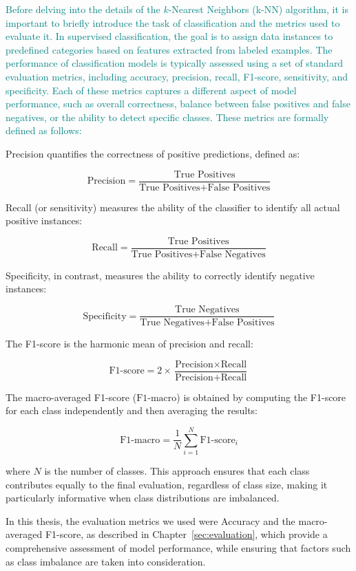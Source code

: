 \documentclass{article}
\begin{document}
\textcolor{teal}{Before delving into the details of the $k$-Nearest Neighbors (k-NN) algorithm, it is important to briefly introduce the task of classification and the metrics used to evaluate it. In supervised classification, the goal is to assign data instances to predefined categories based on features extracted from labeled examples. The performance of classification models is typically assessed using a set of standard evaluation metrics, including accuracy, precision, recall, F1-score, sensitivity, and specificity. Each of these metrics captures a different aspect of model performance, such as overall correctness, balance between false positives and false negatives, or the ability to detect specific classes. These metrics \cite{sokolova2009} are formally defined as follows:}

Precision quantifies the correctness of positive predictions, defined as:

\[
\text{Precision} = \frac{\text{True Positives}}{\text{True Positives} + \text{False Positives}}
\]

Recall (or sensitivity) measures the ability of the classifier to identify all actual positive instances:

\[
\text{Recall} = \frac{\text{True Positives}}{\text{True Positives} + \text{False Negatives}}
\]

Specificity, in contrast, measures the ability to correctly identify negative instances:

\[
\text{Specificity} = \frac{\text{True Negatives}}{\text{True Negatives} + \text{False Positives}}
\]

The F1-score is the harmonic mean of precision and recall:

\[
\text{F1-score} = 2 \times \frac{\text{Precision} \times \text{Recall}}{\text{Precision} + \text{Recall}}
\]

The macro-averaged F1-score (\(\text{F1-macro}\)) is obtained by computing the F1-score for each class independently and then averaging the results:

\[
\text{F1-macro} = \frac{1}{N} \sum_{i=1}^{N} \text{F1-score}_i
\]

where \(N\) is the number of classes. This approach ensures that each class contributes equally to the final evaluation, regardless of class size, making it particularly informative when class distributions are imbalanced.

In this thesis, the evaluation metrics we used were Accuracy and the macro-averaged F1-score, as described in Chapter~\ref{sec:evaluation}, which provide a comprehensive assessment of model performance, while ensuring that factors such as class imbalance are taken into consideration.
\end{document}
